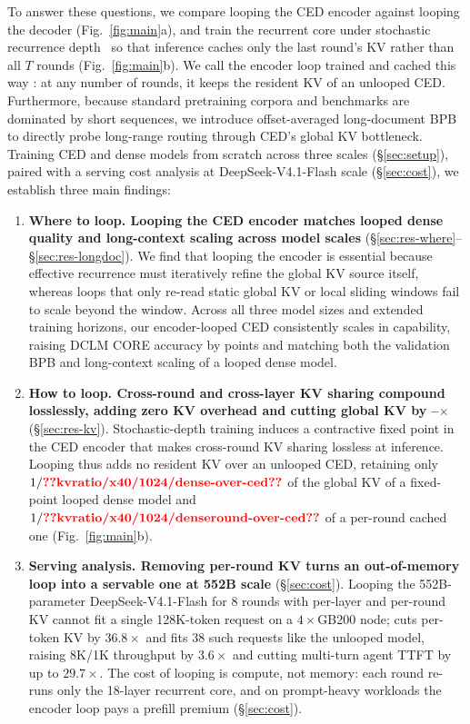To answer these questions, we compare looping the CED encoder against looping the decoder (Fig.~\ref{fig:main}a), and train the recurrent core under stochastic recurrence depth~\citep{deq,parcae,loopsright2} so that inference caches only the last round's KV rather than all $T$ rounds (Fig.~\ref{fig:main}b). We call the encoder loop trained and cached this way \textbf{\ourmethod}: at any number of rounds, it keeps the resident KV of an unlooped CED. Furthermore, because standard pretraining corpora and benchmarks are dominated by short sequences, we introduce offset-averaged long-document BPB to directly probe long-range routing through CED's global KV bottleneck. Training CED and dense models from scratch across three scales (\S\ref{sec:setup}), paired with a serving cost analysis at DeepSeek-V4.1-Flash scale (\S\ref{sec:cost}), we establish three main findings:
\begin{enumerate}
\item \textbf{Where to loop. Looping the CED encoder matches looped dense quality and long-context scaling across model scales} (\S\ref{sec:res-where}--\S\ref{sec:res-longdoc}). We find that looping the encoder is essential because effective recurrence must iteratively refine the global KV source itself, whereas loops that only re-read static global KV or local sliding windows fail to scale beyond the window. Across all three model sizes and extended training horizons, our encoder-looped CED consistently scales in capability, raising DCLM CORE accuracy by  points and matching both the validation BPB and long-context scaling of a looped dense model.
\item \textbf{How to loop. Cross-round and cross-layer KV sharing compound losslessly, adding zero KV overhead and cutting global KV by --$\times$} (\S\ref{sec:res-kv}). Stochastic-depth training induces a contractive fixed point in the CED encoder that makes cross-round KV sharing lossless at inference. Looping thus adds no resident KV over an unlooped CED, retaining only $1/\val{kvratio/x40/1024/dense-over-ced}$ of the global KV of a fixed-point looped dense model and $1/\val{kvratio/x40/1024/denseround-over-ced}$ of a per-round cached one (Fig.~\ref{fig:main}b).
\item \textbf{Serving analysis. Removing per-round KV turns an out-of-memory loop into a servable one at 552B scale} (\S\ref{sec:cost}). Looping the 552B-parameter DeepSeek-V4.1-Flash for 8 rounds with per-layer and per-round KV cannot fit a single 128K-token request on a $4\times$GB200 node; \ourmethod cuts per-token KV by $36.8\times$ and fits 38 such requests like the unlooped model, raising 8K/1K throughput by $3.6\times$ and cutting multi-turn agent TTFT by up to $29.7\times$. The cost of looping is compute, not memory: each round re-runs only the 18-layer recurrent core, and on prompt-heavy workloads the encoder loop pays a prefill premium (\S\ref{sec:cost}).
\end{enumerate}
